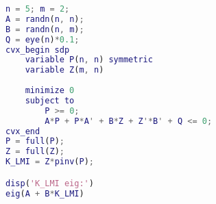 \begin{lstlisting}[language=Matlab]
n = 5; m = 2;
A = randn(n, n);
B = randn(n, m);
Q = eye(n)*0.1;
cvx_begin sdp
    variable P(n, n) symmetric
    variable Z(m, n)
    
    minimize 0
    subject to
    	P >= 0;
        A*P + P*A' + B*Z + Z'*B' + Q <= 0;
cvx_end
P = full(P);
Z = full(Z);
K_LMI = Z*pinv(P);

disp('K_LMI eig:')
eig(A + B*K_LMI)
\end{lstlisting}